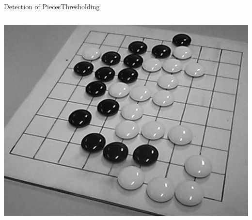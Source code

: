\documentclass[table]{beamer}
\begin{document}
\begin{frame}{Detection of Pieces}{Thresholding}
\begin{columns}
\begin{column}{0.28\textwidth}
{				\includegraphics[width=\columnwidth]{images/pieces_input_v.png}%
			}%
\end{column}
\end{columns}
\end{frame}
\end{document}

